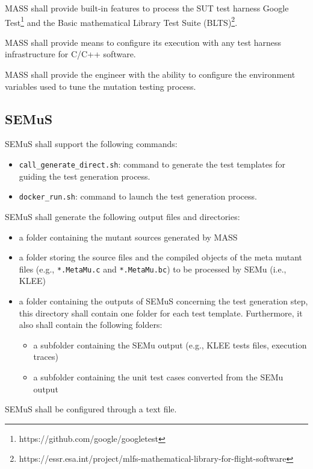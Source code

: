 \RQ{} MASS shall provide built-in features to process the SUT test harness Google Test\footnote{https://github.com/google/googletest} and the Basic mathematical Library Test Suite (BLTS)\footnote{https://essr.esa.int/project/mlfs-mathematical-library-for-flight-software}.

\RQ{} MASS shall provide means to configure its execution with any test harness infrastructure for C/C++ software.

\RQ{} MASS shall provide the engineer with the ability to configure the environment variables used to tune the mutation testing process.

\subsection{SEMuS}

\RQ{} SEMuS shall support the following commands:
	\begin{itemize}
	\item \texttt{call\_generate\_direct.sh}: command to generate the test templates for guiding the test generation process.
	\item \texttt{docker\_run.sh}: command to launch the test generation process.
\end{itemize}

\RQ{} SEMuS shall generate the following output files and directories:
\begin{itemize}
	\item a folder containing the mutant sources generated by MASS
	\item a folder storing the source files and the compiled objects of the meta mutant files (e.g., \texttt{*.MetaMu.c} and \texttt{*.MetaMu.bc}) to be processed by SEMu (i.e., KLEE)
	\item a folder containing the outputs of SEMuS concerning the test generation step, this directory shall contain one folder for each test template. Furthermore, it also shall contain the following folders:
	\begin{itemize}
		\item a subfolder containing the SEMu output (e.g., KLEE tests files, execution traces)
		\item a subfolder containing the unit test cases converted from the SEMu output
	\end{itemize}

\end{itemize}

\RQ{} SEMuS shall be configured through a text file.

